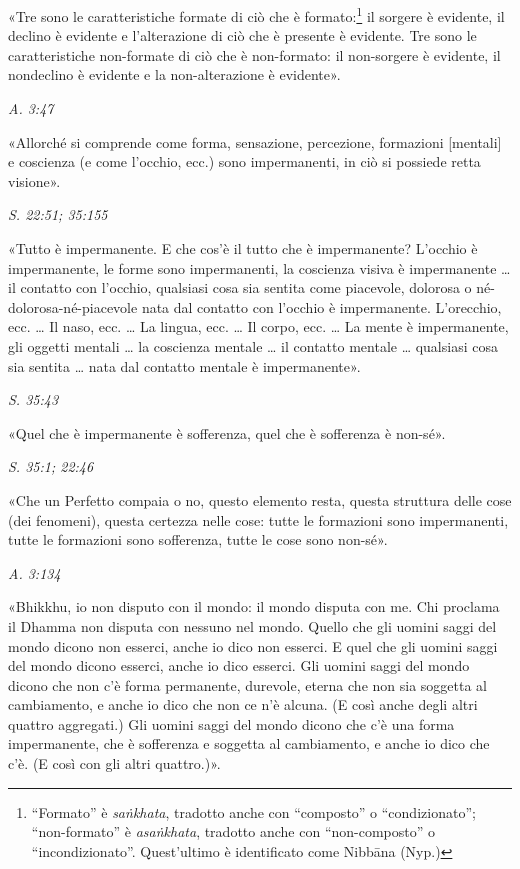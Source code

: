  «Tre sono le caratteristiche formate di ciò che è
formato:\footnote{“Formato” è \emph{saṅkhata}, tradotto anche con “composto” o “condizionato”; “non-formato” è \emph{asaṅkhata}, tradotto anche con “non-composto” o “incondizionato”. Quest’ultimo è identificato come Nibbāna (Nyp.)}
il sorgere è evidente, il declino è evidente
e l’alterazione di ciò che è presente è evidente. Tre sono le
caratteristiche non-formate di ciò che è non-formato: il non-sorgere è
evidente, il nondeclino è evidente e la non-alterazione è evidente».


\emph{A. 3:47}


«Allorché si comprende come forma, sensazione, percezione, formazioni
[mentali] e coscienza (e come l’occhio, ecc.) sono impermanenti, in ciò
si possiede retta visione».


\emph{S. 22:51; 35:155}


«Tutto è impermanente. E che cos’è il tutto che è impermanente? L’occhio
è impermanente, le forme sono impermanenti, la coscienza visiva è
impermanente … il contatto con l’occhio, qualsiasi cosa sia sentita come
piacevole, dolorosa o né-dolorosa-né-piacevole nata dal contatto con
l’occhio è impermanente. L’orecchio, ecc. … Il naso, ecc. … La lingua,
ecc. … Il corpo, ecc. … La mente è impermanente, gli oggetti mentali …
la coscienza mentale … il contatto mentale … qualsiasi cosa sia sentita
… nata dal contatto mentale è impermanente».


\emph{S. 35:43}


«Quel che è impermanente è sofferenza, quel che è sofferenza è non-sé».


\emph{S. 35:1; 22:46}


«Che un Perfetto compaia o no, questo elemento resta, questa struttura
delle cose (dei fenomeni), questa certezza nelle cose: tutte le
formazioni sono impermanenti, tutte le formazioni sono sofferenza, tutte
le cose sono non-sé».


\emph{A. 3:134}


«Bhikkhu, io non disputo con il mondo: il mondo disputa con me. Chi
proclama il Dhamma non disputa con nessuno nel mondo. Quello che gli
uomini saggi del mondo dicono non esserci, anche io dico non esserci. E
quel che gli uomini saggi del mondo dicono esserci, anche io dico
esserci. Gli uomini saggi del mondo dicono che non c’è forma permanente,
durevole, eterna che non sia soggetta al cambiamento, e anche io dico
che non ce n’è alcuna. (E così anche degli altri quattro aggregati.) Gli
uomini saggi del mondo dicono che c’è una forma impermanente, che è
sofferenza e soggetta al cambiamento, e anche io dico che c’è. (E così
con gli altri quattro.)».


